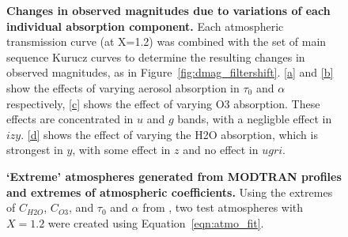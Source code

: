 \documentclass[12pt,preprint]{aastex}
\begin{document}
\begin{figure}
\caption{{\small
{\bf Changes in observed magnitudes due to variations of each
individual absorption component.} Each atmospheric transmission curve
(at X=1.2) was combined with the set of main sequence Kurucz curves to
determine the resulting changes in observed magnitudes, as in
Figure~\ref{fig:dmag_filtershift}. \ref{a} and \ref{b} show the
effects of varying aerosol absorption in $\tau_0$ and $\alpha$
respectively, \ref{c} shows the effect of varying O3 absorption. These
effects are concentrated in $u$ and $g$ bands, with a negligble effect
in $izy$. \ref{d} shows the effect of varying the H2O absorption,
which is strongest in $y$, with some effect in $z$ and no effect in
$ugri$.
}}
\label{fig:dmag_atm_comps}
\end{figure}

\begin{figure}
\centering
{}
\caption{{\small 
{\bf `Extreme' atmospheres generated from MODTRAN profiles and extremes 
of atmospheric coefficients.} Using the extremes of $C_{H2O}$, $C_{O3}$,
and $\tau_0$ and $\alpha$ from \citet{Burke2010b}, two test atmospheres
with $X=1.2$ were created using Equation~\ref{eqn:atmo_fit}. 
}}
\label{fig:atm_changes}
\end{figure}
\end{document}
